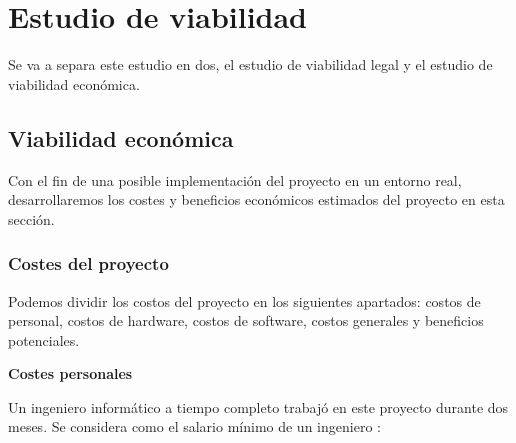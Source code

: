 \section{Estudio de viabilidad}

Se va a separa este estudio en dos, el estudio de viabilidad legal y el estudio de viabilidad económica.

\subsection{Viabilidad económica}

Con el fin de una posible implementación del proyecto en un entorno real, desarrollaremos los costes y beneficios económicos estimados del proyecto en esta sección.

\subsubsection{Costes del proyecto}

Podemos dividir los costos del proyecto en los siguientes apartados: costos de personal, costos de hardware, costos de software, costos generales y beneficios potenciales.

\textbf{Costes personales}

Un ingeniero informático a tiempo completo trabajó en este proyecto durante dos meses. Se considera como el salario mínimo de un ingeniero \cite{salariogob}:

